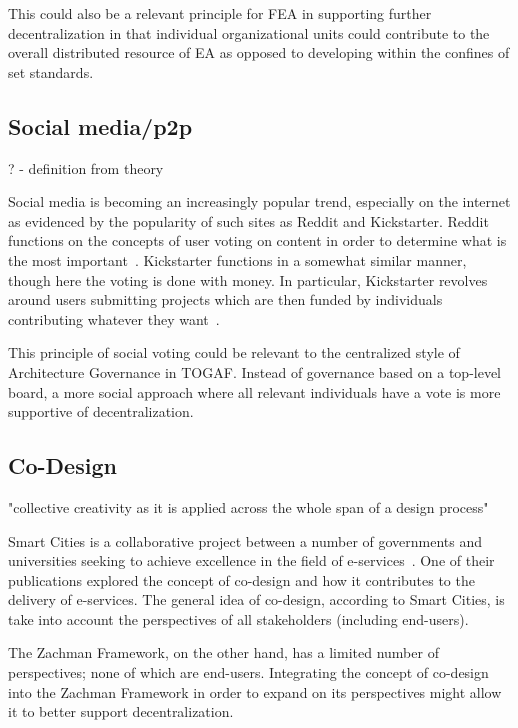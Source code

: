 This could also be a relevant principle for FEA in supporting further decentralization in that individual organizational units could contribute to the overall distributed resource of EA as opposed to developing within the confines of set standards. 

%
%

\subsection{Social media/p2p}


? - definition from theory


Social media is becoming an increasingly popular trend, especially on the internet as evidenced by the popularity of such sites as Reddit and Kickstarter. Reddit functions on the concepts of user voting on content in order to determine what is the most important~\cite{RedditInc.}. Kickstarter functions in a somewhat similar manner, though here the voting is done with money. In particular, Kickstarter revolves around users submitting projects which are then funded by individuals contributing whatever they want~\cite{KickstarterInc.}.


This principle of social voting could be relevant to the centralized style of Architecture Governance in TOGAF. Instead of governance based on a top-level board, a more social approach where all relevant individuals have a vote is more supportive of decentralization. 


\subsection{Co-Design}

"collective creativity as it is applied across the whole span of a design process" ~\cite{sanders2008co}


Smart Cities is a collaborative project between a number of governments and universities seeking to achieve excellence in the field of e-services~\cite{Cities}. One of their publications explored the concept of co-design and how it contributes to the delivery of e-services.  The general idea of co-design, according to Smart Cities, is take into account the perspectives of all stakeholders (including end-users). 


The Zachman Framework, on the other hand, has a limited number of perspectives; none of which are end-users. Integrating the concept of co-design into the Zachman Framework in order to expand on its perspectives might allow it to better support decentralization. 


